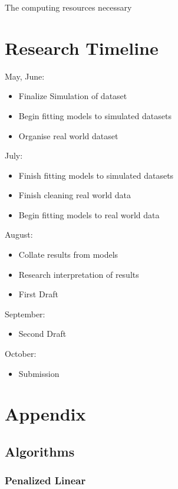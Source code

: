 \documentclass[a4paper]{article}
\begin{document}
	The computing resources necessary 
	
	\section{Research Timeline}
	
	May, June:
	\begin{itemize}
		\item Finalize Simulation of dataset
		\item Begin fitting models to simulated datasets
		\item Organise real world dataset
	\end{itemize}
	
	July:
	\begin{itemize}
		\item Finish fitting models to simulated datasets
		\item Finish cleaning real world data
		\item Begin fitting models to real world data
	\end{itemize}
	
	August:
	\begin{itemize}
		\item Collate results from models
		\item Research interpretation of results
		\item First Draft
	\end{itemize}
	
	September:
	\begin{itemize}
		\item Second Draft
	\end{itemize}
	
	October:
	\begin{itemize}
		\item Submission
	\end{itemize}
	
	\section{Appendix}
	
	\subsection{Algorithms}
	\label{Algorithms}
	
	\subsubsection{Penalized Linear}
	
\end{document}
